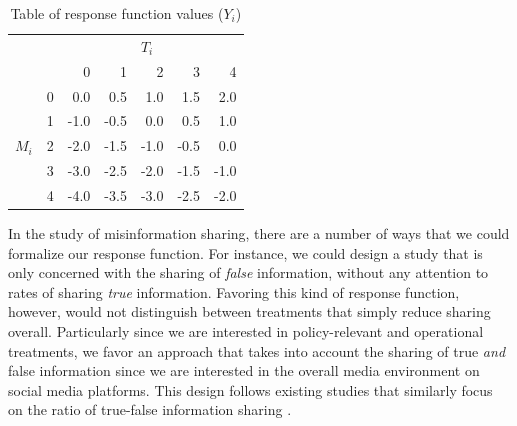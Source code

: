 \documentclass[letterpaper, 12pt, parskip=full,DIV=10]{scrartcl}
\begin{document}
\begin{table}[!ht]
\centering
\begin{tabular}{lrrrrrr}
                                   & \multicolumn{1}{l}{}   & \multicolumn{1}{l}{} & \multicolumn{1}{l}{} & \multicolumn{1}{l}{\textbf{$T_i$}} & \multicolumn{1}{l}{} & \multicolumn{1}{l}{}      \\ \cline{3-7} 
                                   & \multicolumn{1}{r|}{}  & 0                    & 1                    & 2                                 & 3                    & \multicolumn{1}{r|}{4}    \\ \cline{2-7} 
\multicolumn{1}{l|}{}              & \multicolumn{1}{r|}{0} & 0.0                  & 0.5                  & 1.0                               & 1.5                  & \multicolumn{1}{r|}{2.0}  \\
\multicolumn{1}{l|}{}              & \multicolumn{1}{r|}{1} & -1.0                 & -0.5                 & 0.0                               & 0.5                  & \multicolumn{1}{r|}{1.0}  \\
\multicolumn{1}{l|}{\textbf{$M_i$}} & \multicolumn{1}{r|}{2} & -2.0                 & -1.5                 & -1.0                              & -0.5                 & \multicolumn{1}{r|}{0.0}  \\
\multicolumn{1}{l|}{}              & \multicolumn{1}{r|}{3} & -3.0                 & -2.5                 & -2.0                              & -1.5                 & \multicolumn{1}{r|}{-1.0} \\
\multicolumn{1}{l|}{}              & \multicolumn{1}{r|}{4} & -4.0                 & -3.5                 & -3.0                              & -2.5                 & \multicolumn{1}{r|}{-2.0} \\ \cline{2-7} 
\end{tabular}
\caption{Table of response function values ($Y_i$)}
\label{tab:response_fun}
\end{table}



{In the study of misinformation sharing, there are a number of ways that we could formalize our response function. For instance, we could design a study that is only concerned with the sharing of \textit{false} information, without any attention to rates of sharing \textit{true} information. Favoring this kind of response function, however, would not distinguish between treatments that simply reduce sharing overall. Particularly since we are interested in policy-relevant and operational treatments, we favor an approach that takes into account the sharing of true \textit{and} false information since we are interested in the overall media environment on social media platforms.} This design follows existing studies that similarly focus on the ratio of true-false information sharing \citep{jahanbakhsh2021exploring}.
\end{document}
